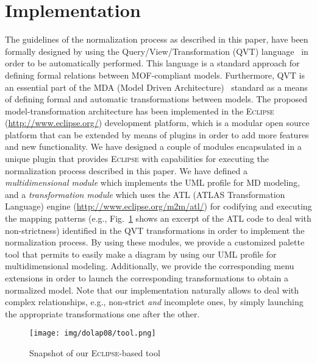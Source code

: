 \section{Implementation}
\label{a3:sec:implementation} The guidelines of the normalization
process as described in this paper, have been formally designed by
using the Que\-ry/Vi\-ew/Trans\-for\-ma\-tion (QVT)
language~\cite{OMG/QVT} in order to be automatically performed. This
language is a standard approach for defining formal relations
between MOF-compliant models. Furthermore, QVT is an essential part
of the MDA (Model Driven Architecture)~\cite{OMG/MDA} standard as a
means of defining formal and automatic transformations between
models. The proposed model-transformation architecture has been
implemented in the \textsc{Eclipse} (\url{http://www.eclipse.org/})
development platform, which is a modular open source platform that
can be extended by means of plugins in order to add more features
and new functionality.  We have designed a couple of modules
encapsulated in a unique plugin that provides \textsc{Eclipse} with
capabilities for executing the normalization process described in
this paper. We have defined a \emph{multidimensional module} which
implements the UML profile for MD modeling, and a
\emph{transformation module} which uses the \textsc{ATL} (ATLAS
Transformation Language) engine
(\url{http://www.eclipse.org/m2m/atl/}) for codifying and executing
the mapping patterns (e.g., Fig.~\ref{a3:fig:tool} shows an excerpt
of the ATL code to deal with non-strictness) identified in the QVT
transformations in order to implement the normalization process. By
using these modules, we provide a customized palette tool that
permits to easily make a diagram by using our UML profile for
multidimensional modeling. Additionally, we provide the
corresponding menu extensions in order to launch the corresponding
transformations to obtain a normalized model.  Note that our
implementation naturally allows to deal with complex relationships,
e.g., non-strict \emph{and} incomplete ones, by simply launching the
appropriate transformations one after the other.

\begin{figure}
\begin{center}
\texttt{[image: img/dolap08/tool.png]}
\end{center}
\caption{Snapshot of our \textsc{Eclipse}-based tool}
\label{a3:fig:tool}
\end{figure}



